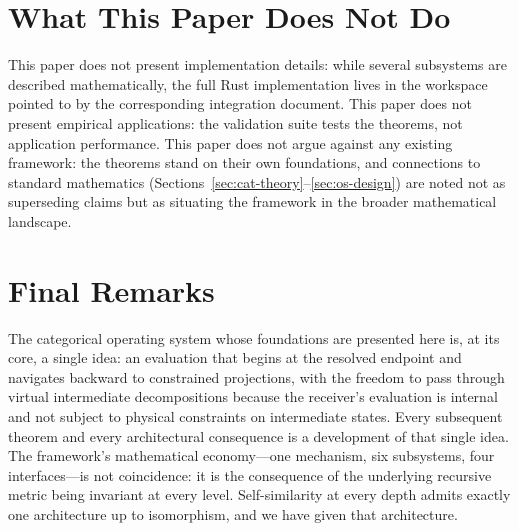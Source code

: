 \documentclass[twocolumn,a4paper]{article}
\begin{document}
\section{What This Paper Does Not Do}

This paper does not present implementation details: while several subsystems are described mathematically, the full Rust implementation lives in the workspace pointed to by the corresponding integration document. This paper does not present empirical applications: the validation suite tests the theorems, not application performance. This paper does not argue against any existing framework: the theorems stand on their own foundations, and connections to standard mathematics (Sections~\ref{sec:cat-theory}--\ref{sec:os-design}) are noted not as superseding claims but as situating the framework in the broader mathematical landscape.

\section{Final Remarks}

The categorical operating system whose foundations are presented here is, at its core, a single idea: an evaluation that begins at the resolved endpoint and navigates backward to constrained projections, with the freedom to pass through virtual intermediate decompositions because the receiver's evaluation is internal and not subject to physical constraints on intermediate states. Every subsequent theorem and every architectural consequence is a development of that single idea. The framework's mathematical economy---one mechanism, six subsystems, four interfaces---is not coincidence: it is the consequence of the underlying recursive metric being invariant at every level. Self-similarity at every depth admits exactly one architecture up to isomorphism, and we have given that architecture.



\end{document}
